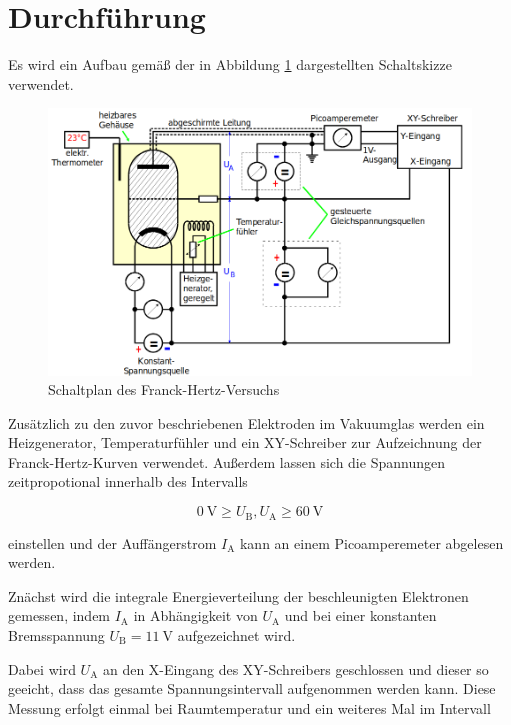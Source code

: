 \section{Durchführung}
\label{sec:Durchführung}

Es wird ein Aufbau gemäß der in Abbildung \ref{fig:bild4} dargestellten Schaltskizze
verwendet.

\begin{figure} [H]
    \centering
    \includegraphics[scale=0.4]{content/bild4.png}
    \caption{Schaltplan des Franck-Hertz-Versuchs}
    \label{fig:bild4}
  \end{figure}

  Zusätzlich zu den zuvor beschriebenen Elektroden im Vakuumglas werden
  ein Heizgenerator, Temperaturfühler und ein XY-Schreiber zur Aufzeichnung der
  Franck-Hertz-Kurven verwendet. Außerdem lassen sich die Spannungen zeitpropotional
  innerhalb des Intervalls

  \begin{equation*}
      \SI{0}{\volt} \geq U_\text{B}, U_\text{A} \geq \SI{60}{\volt}
  \end{equation*}

  einstellen und der Auffängerstrom $I_\text{A}$ kann an einem Picoamperemeter abgelesen werden.

  Znächst wird die integrale Energieverteilung der beschleunigten Elektronen gemessen, indem
  $I_\text{A}$ in Abhängigkeit von $U_\text{A}$ und bei einer konstanten
  Bremsspannung $U_\text{B} = \SI{11}{\volt}$ aufgezeichnet wird.

  Dabei wird $U_\text{A}$ an den X-Eingang des XY-Schreibers geschlossen und dieser so geeicht,
  dass das gesamte Spannungsintervall aufgenommen werden kann. Diese Messung erfolgt einmal
  bei Raumtemperatur und ein weiteres Mal im Intervall 

